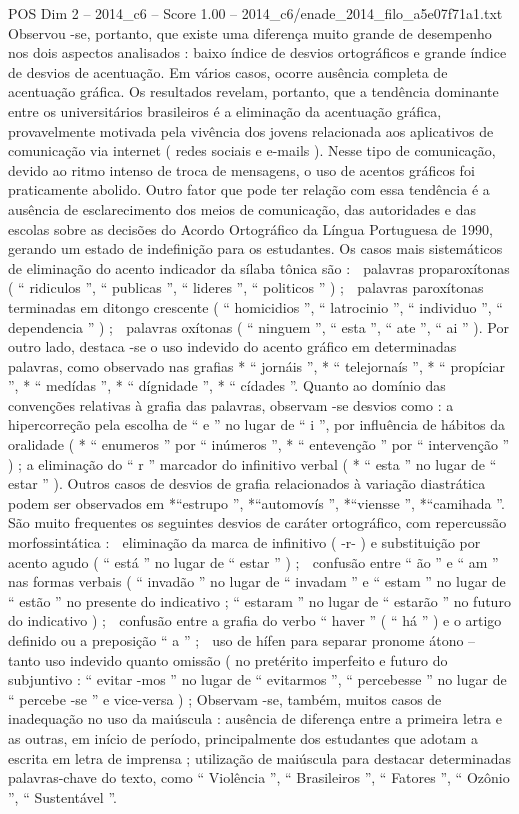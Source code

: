 \begin{textsample}{POS Dim 2 – 2014\_c6 – Score 1.00 – 2014\_c6/enade\_2014\_filo\_a5e07f71a1.txt}
Observou -se, portanto, que existe uma diferença muito grande de desempenho nos dois aspectos analisados : baixo índice de desvios ortográficos e grande índice de desvios de acentuação.
Em vários casos, ocorre ausência completa de acentuação gráfica.
Os resultados revelam, portanto, que a tendência dominante entre os universitários brasileiros é a eliminação da acentuação gráfica, provavelmente motivada pela vivência dos jovens relacionada aos aplicativos de comunicação via internet ( redes sociais e e-mails ).
Nesse tipo de comunicação, devido ao ritmo intenso de troca de mensagens, o uso de acentos gráficos foi praticamente abolido.
Outro fator que pode ter relação com essa tendência é a ausência de esclarecimento dos meios de comunicação, das autoridades e das escolas sobre as decisões do Acordo Ortográfico da Língua Portuguesa de 1990, gerando um estado de indefinição para os estudantes.
Os casos mais sistemáticos de eliminação do acento indicador da sílaba tônica são :  palavras proparoxítonas ( “ ridiculos ”, “ publicas ”, “ lideres ”, “ politicos ” ) ;  palavras paroxítonas terminadas em ditongo crescente ( “ homicidios ”, “ latrocinio ”, “ individuo ”, “ dependencia ” ) ;  palavras oxítonas ( “ ninguem ”, “ esta ”, “ ate ”, “ ai ” ).
Por outro lado, destaca -se o uso indevido do acento gráfico em determinadas palavras, como observado nas grafias * “ jornáis ”, * “ telejornaís ”, * “ propíciar ”, * “ medídas ”, * “ dígnidade ”, * “ cídades ”.
Quanto ao domínio das convenções relativas à grafia das palavras, observam -se desvios como : a hipercorreção pela escolha de “ e ” no lugar de “ i ”, por influência de hábitos da oralidade ( * “ enumeros ” por “ inúmeros ”, * “ entevenção ” por “ intervenção ” ) ; a eliminação do “ r ” marcador do infinitivo verbal ( * “ esta ” no lugar de “ estar ” ).
Outros casos de desvios de grafia relacionados à variação diastrática podem ser observados em *“estrupo ”, *“automovís ”, *“viensse ”, *“camihada ”.
São muito frequentes os seguintes desvios de caráter ortográfico, com repercussão morfossintática :  eliminação da marca de infinitivo ( -r- ) e substituição por acento agudo ( “ está ” no lugar de “ estar ” ) ;  confusão entre “ ão ” e “ am ” nas formas verbais ( “ invadão ” no lugar de “ invadam ” e “ estam ” no lugar de “ estão ” no presente do indicativo ; “ estaram ” no lugar de “ estarão ” no futuro do indicativo ) ;  confusão entre a grafia do verbo “ haver ” ( “ há ” ) e o artigo definido ou a preposição “ a ” ;  uso de hífen para separar pronome átono – tanto uso indevido quanto omissão ( no pretérito imperfeito e futuro do subjuntivo : “ evitar -mos ” no lugar de “ evitarmos ”, “ percebesse ” no lugar de “ percebe -se ” e vice-versa ) ; Observam -se, também, muitos casos de inadequação no uso da maiúscula : ausência de diferença entre a primeira letra e as outras, em início de período, principalmente dos estudantes que adotam a escrita em letra de imprensa ; utilização de maiúscula para destacar determinadas palavras-chave do texto, como “ Violência ”, “ Brasileiros ”, “ Fatores ”, “ Ozônio ”, “ Sustentável ”.

\end{textsample}
